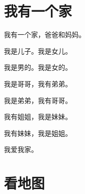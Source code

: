 \documentclass[12pt,UTF-8,openany]{ctexbook}
\begin{document}
\hanzibox{}\hanzibox{}\hanzibox{}\hanzibox{}\hspace{1em}\hanzibox{}\hanzibox{}\hanzibox{}\hanzibox{}






\chapter{我有一个家}

\begin{large}
    
    我有一个家，爸爸和妈妈。
    
    我是儿子。我是女儿。
    
    我是男的。我是女的。
    
    我是哥哥，我有弟弟。
    
    我是弟弟，我有哥哥。
    
    我有姐姐，我是妹妹。
    
    我有妹妹，我是姐姐。
    
    我爱我家。
    
\end{large}


\clearpage

\begin{center}
    
    
\end{center}


\hanzibox{}\hanzibox{}\hanzibox{}\hanzibox{}\hspace{1em}\hanzibox{}\hanzibox{}\hanzibox{}\hanzibox{}

\hanzibox{}\hanzibox{}\hanzibox{}\hanzibox{}\hspace{1em}\hanzibox{}\hanzibox{}\hanzibox{}\hanzibox{}

\hanzibox{}\hanzibox{}\hanzibox{}\hanzibox{}\hspace{1em}\hanzibox{}\hanzibox{}\hanzibox{}\hanzibox{}

\hanzibox{}\hanzibox{}\hanzibox{}\hanzibox{}\hspace{1em}




\chapter{看地图}
\end{document}
